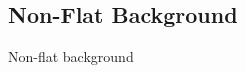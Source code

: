 \documentclass[../AnalysisNoteJBuxton.tex]{subfiles}
\begin{document}
\subsection{Non-Flat Background}
\label{NonFlatBackground}


Non-flat background
\end{document}
